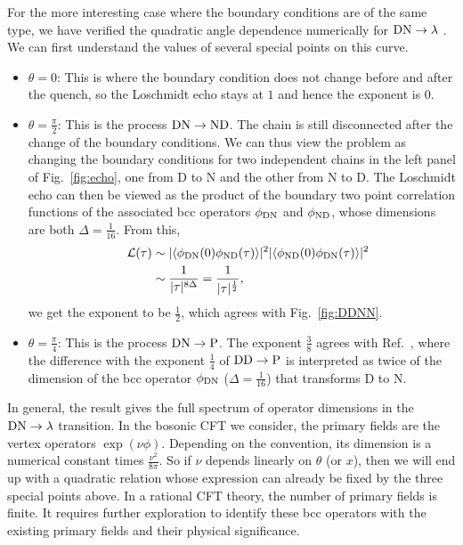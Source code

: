 For the more interesting case where the boundary conditions are of the same type, we have verified the quadratic angle dependence numerically for ${\rm DN} \rightarrow \lambda$ {\iffalse \color{red}the process in Eq.~\eqref{eq:DNDN}.\fi}. We can first understand the values of several special points on this curve. 
\begin{itemize}
\item $\theta = 0$: This is where the boundary condition does not change before and after the quench, so the Loschmidt echo stays at $1$ and hence the exponent is $0$.
\item $\theta = \frac{\pi}{2}$: This is the process ${\rm DN}\rightarrow {\rm  ND}$. The chain is still disconnected after the change of the boundary conditions. We can thus view the problem as changing the boundary conditions for two independent chains in the left panel of Fig.~\ref{fig:echo}, one from D to N and the other from N to D. The Loschmidt echo can then be viewed as the product of the boundary two point correlation functions of the associated bcc operators $\phi_{\rm DN}$ and $\phi_{\rm ND}$, whose dimensions are both $\Delta = \frac{1}{16}$. From this,
\begin{equation}
\begin{aligned}
  \quad \mathcal{L}(\tau) &\sim |\langle \phi_{{\rm D N}}(0) \phi_{{\rm ND}}(\tau)   \rangle |^2 
|\langle \phi_{{\rm ND}}(0)  \phi_{{\rm DN}}(\tau)   \rangle| ^2\\
& \sim \frac{1}{|\tau|^{8\Delta}} = \frac{1}{|\tau|^{\frac{1}{2}}},
\end{aligned}
\end{equation}
we get the exponent to be $\frac{1}{2}$, which agrees with Fig.~\ref{fig:DDNN}. 
\item $\theta = \frac{\pi}{4}$: This is the process ${\rm DN}\rightarrow {\rm P}$. The exponent $\frac{3}{8}$ agrees with Ref.~, where the difference with the exponent $\frac{1}{4}$ of ${\rm DD} \rightarrow {\rm P}$ is interpreted as twice of the dimension of the bcc operator $\phi_{\rm DN}$ ($\Delta = \frac{1}{16}$) that transforms D to N.
\end{itemize}
In general, the result gives the full spectrum of operator dimensions in the ${\rm DN} \rightarrow \lambda $ transition. In the bosonic CFT we consider, the primary fields are the vertex operators $\exp( \nu \phi )$. Depending on the convention, its dimension is a numerical constant times $\frac{\nu^2}{8\pi}$. So if $\nu$ depends linearly on $\theta$ (or $x$), then we will end up with a quadratic relation whose expression can already be fixed by the three special points above. In a rational CFT theory, the number of primary fields is finite. It requires further exploration to identify these bcc operators with the existing primary fields and their physical significance. 

